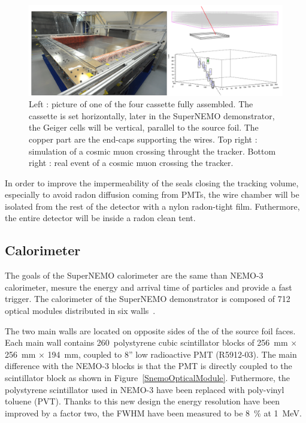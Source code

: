 \documentclass[main.tex]{subfiles}
\begin{document}
\begin{figure}[h!]
\begin{center}
\includegraphics[scale=0.25]{pictures/Chap3/TrackerTestCosmic.png}
\caption{Left : picture of one of the four cassette fully assembled. The cassette is set horizontally, later in the SuperNEMO demonstrator, the Geiger cells will be vertical, parallel to the source foil. The copper part are the end-caps supporting the wires. Top right : simulation of a cosmic muon crossing throught the tracker. Bottom right : real event of a cosmic muon crossing the tracker.}
\label{SnemoTracker}
\end{center}
\end{figure}


\NI In order to improve the impermeability of the seals closing the tracking volume, especially to avoid radon diffusion coming from PMTs, the wire chamber will be isolated from the rest of the detector with a nylon radon-tight film. Futhermore, the entire detector will be inside a radon clean tent.


\FloatBarrier


\subsection{Calorimeter}


\NI The goals of the SuperNEMO calorimeter are the same than NEMO-3 calorimeter, mesure the energy and arrival time of particles and provide a fast trigger. The calorimeter of the SuperNEMO demonstrator is composed of 712 optical modules distributed in six walls~\cite{SNCalorimeter}.


\bigskip


\NI The two main walls are located on opposite sides of the of the source foil faces. Each main wall contains 260~polystyrene cubic scintillator blocks of 256~mm $\times$ 256~mm $\times$ 194~mm, coupled to 8'' low radioactive PMT (R5912-03). The main difference with the NEMO-3 blocks is that the PMT is directly coupled to the scintillator block as shown in Figure~\ref{SnemoOpticalModule}. Futhermore, the polystyrene scintillator used in NEMO-3 have been replaced with poly-vinyl toluene (PVT). Thanks to this new design the energy resolution have been improved by a factor two, the FWHM have been measured to be 8~\% at 1~MeV.
\end{document}
